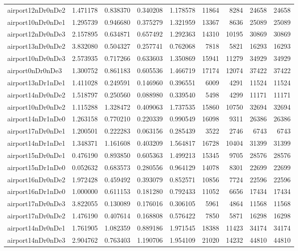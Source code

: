 \begin{longtable}{|l|r|r|r|r|r|r|r|r|}
airport12nDr0nDe2 & 1.471178 & 0.838370 & 0.340208 & 1.178578 & 11864 & 8284 & 24658 & 24658 \\
airport10nDr0nDe1 & 1.295739 & 0.946680 & 0.375279 & 1.321959 & 13367 & 8636 & 25089 & 25089 \\
airport12nDr0nDe3 & 2.157895 & 0.634871 & 0.657492 & 1.292363 & 14310 & 10195 & 30869 & 30869 \\
airport13nDr0nDe2 & 3.832080 & 0.504327 & 0.257741 & 0.762068 & 7818 & 5821 & 16293 & 16293 \\
airport10nDr0nDe3 & 2.573935 & 0.717266 & 0.633603 & 1.350869 & 15941 & 11279 & 34929 & 34929 \\
airport0nDr0nDe3 & 1.300752 & 0.861183 & 0.605536 & 1.466719 & 17174 & 12074 & 37422 & 37422 \\
airport13nDr1nDe1 & 1.411028 & 0.249591 & 0.146960 & 0.396551 & 6009 & 4291 & 11524 & 11524 \\
airport14nDr0nDe2 & 1.518797 & 0.250560 & 0.088980 & 0.339540 & 5498 & 4299 & 11171 & 11171 \\
airport10nDr0nDe2 & 1.115288 & 1.328472 & 0.409063 & 1.737535 & 15860 & 10750 & 32694 & 32694 \\
airport14nDr1nDe0 & 1.263158 & 0.770210 & 0.220339 & 0.990549 & 16098 & 9311 & 26386 & 26386 \\
airport17nDr0nDe1 & 1.200501 & 0.222283 & 0.063156 & 0.285439 & 3522 & 2746 & 6743 & 6743 \\
airport14nDr1nDe1 & 1.348371 & 1.161608 & 0.403209 & 1.564817 & 16728 & 10404 & 31399 & 31399 \\
airport15nDr0nDe1 & 0.476190 & 0.893850 & 0.605363 & 1.499213 & 15345 & 9705 & 28576 & 28576 \\
airport15nDr1nDe0 & 0.052632 & 0.683573 & 0.280556 & 0.964129 & 14078 & 8301 & 22699 & 22699 \\
airport16nDr0nDe2 & 1.972428 & 0.459492 & 0.393079 & 0.852571 & 10856 & 7724 & 22596 & 22596 \\
airport16nDr1nDe0 & 1.000000 & 0.611153 & 0.181280 & 0.792433 & 11052 & 6656 & 17434 & 17434 \\
airport17nDr0nDe3 & 3.822055 & 0.130089 & 0.176016 & 0.306105 & 5961 & 4864 & 11568 & 11568 \\
airport17nDr0nDe2 & 1.476190 & 0.407614 & 0.168808 & 0.576422 & 7850 & 5871 & 16298 & 16298 \\
airport14nDr0nDe1 & 1.761905 & 1.082359 & 0.889186 & 1.971545 & 18388 & 11423 & 34174 & 34174 \\
airport14nDr0nDe3 & 2.904762 & 0.763403 & 1.190706 & 1.954109 & 21020 & 14232 & 44810 & 44810 \\

\end{longtable}
